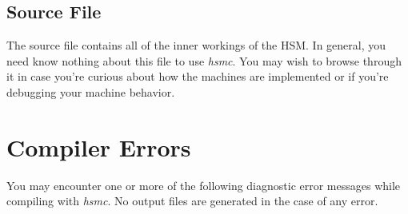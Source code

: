 \documentclass[titlepage,letterpaper]{report}
\begin{document}
\subsection{Source File}

The source file contains all of the inner workings of the HSM.  In general, you need
know nothing about this file to use \emph{hsmc}.  You may wish to browse through it
in case you're curious about how the machines are implemented or if you're debugging
your machine behavior.


\section{Compiler Errors}

You may encounter one or more of the following diagnostic error messages while
compiling with \emph{hsmc}.  No output files are generated in the case of any error.
\end{document}
